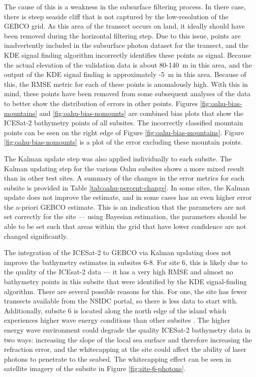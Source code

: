 The cause of this is a weakness in the subsurface filtering process. In there case, there is steep seaside cliff that is not captured by the low-resolution of the GEBCO grid. As this area of the transect occurs on land, it ideally should have been removed during the horizontal filtering step. Due to this issue, points are inadvertently included in the subsurface photon dataset for the transect, and the KDE signal finding algorithm incorrectly identifies these points as signal. Because the actual elevation of the validation data is about 80-140~m in this area, and the output of the KDE signal finding is approximately -5~m in this area. Because of this, the RMSE metric for each of these points is anomalously high. With this in mind, these points have been removed from some subsequent analyses of the data to better show the distribution of errors in other points. Figures \ref{fig:oahu-bias-mountains} and \ref{fig:oahu-bias-nomounts} are combined bias plots that show the ICESat-2 bathymetry points of all subsites. The incorrectly classified mountain points can be seen on the right edge of Figure \ref{fig:oahu-bias-mountains}. Figure \ref{fig:oahu-bias-nomounts} is a plot of the error excluding these mountain points. 

The Kalman update step was also applied individually to each subsite. The Kalman updating step for the various Oahu subsites shows a more mixed result than in other test sites. A summary of the changes in the error metrics for each subsite is provided in Table \ref{tab:oahu-percent-change}. In some sites, the Kalman update does not improve the estimate, and in some cases has an even higher error the a-priori GEBCO estimate. This is an indication that the parameters are not set correctly for the site --- using Bayesian estimation, the parameters should be able to be set such that areas within the grid that have lower confidence are not changed significantly. 

The integration of the ICESat-2 to GEBCO via Kalman updating does not improve the bathymetry estimates in subsites 6-8. For site 6, this is likely due to the quality of the ICEsat-2 data --- it has a very high RMSE and almost no bathymetry points in this subsite that were identified by the KDE signal-finding algorithm. There are several possible reasons for this. For one, the site has fewer transects available from the NSIDC portal, so there is less data to start with. Additionally, subsite 6 is located along the north edge of the island which experiences higher wave energy conditions than other subsites \parencite{Vitousek2008a}. The higher energy wave environment could degrade the quality ICESat-2 bathymetry data in two ways: increasing the slope of the local sea surface and therefore increasing the refraction error, and the whitecapping at the site could affect the ability of laser photons to penetrate to the seabed. The whitecapping effect can be seen in satellite imagery of the subsite in Figure \ref{fig:site-6-photons}.


